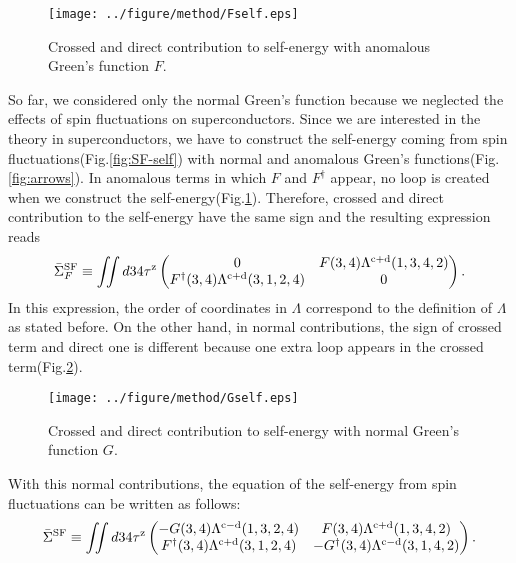 \begin{figure} %
	\centering
	\texttt{[image: ../figure/method/Fself.eps]}
	\caption{Crossed and direct contribution to self-energy with anomalous Green's function $F$.}
	\label{fig:Fself}
\end{figure}
So far, we considered only the normal Green's function because
we neglected the effects of spin fluctuations on superconductors.
Since we are interested in the theory in superconductors, we have to 
construct the self-energy coming from spin fluctuations(Fig.\ref{fig:SF-self})
with normal and anomalous Green's functions(Fig.\ref{fig:arrows}).
In anomalous terms in which $F$ and $F^\dag$ appear, no loop is created
when we construct the self-energy(Fig.\ref{fig:Fself}).
Therefore, crossed and direct contribution to the self-energy have the 
same sign and the resulting expression reads
%
\begin{equation}
	\bar{\Sigma}^{\rm SF}_F \equiv \iint d34 \tau^{\rm z}
	\begin{pmatrix}
		0 & F(3,4)\Lambda^{\rm c + \rm d}(1,3,4,2) \\
		F^\dag(3,4)\Lambda^{\rm c + \rm d}(3,1,2,4) &0
	\end{pmatrix}.
	\label{eq:Fself}
\end{equation}
%
In this expression, the order of coordinates in $\Lambda$ correspond to the definition of $\Lambda$ as stated before.
On the other hand, in normal contributions, the sign of crossed term and
direct one is different because one extra loop appears in the crossed term(Fig.\ref{fig:Gself}).
%
\begin{figure} %
	\centering
	\texttt{[image: ../figure/method/Gself.eps]}
	\caption{Crossed and direct contribution to self-energy with normal Green's function $G$.}
	\label{fig:Gself}
\end{figure}
%
With this normal contributions, the equation of the self-energy from spin fluctuations can be written as follows:
%
\begin{equation}
	\bar{\Sigma}^{\rm SF} \equiv \iint d34 \tau^{\rm z}
	\begin{pmatrix}
		-G(3,4)\Lambda^{\rm c - \rm d}(1,3,2,4) & F(3,4)\Lambda^{\rm c + \rm d}(1,3,4,2) \\
		F^\dag(3,4)\Lambda^{\rm c + \rm d}(3,1,2,4) & -G^\dag(3,4)\Lambda^{\rm c - \rm d}(3,1,4,2)
	\end{pmatrix}.
	\label{eq:GFself}
\end{equation}
%

